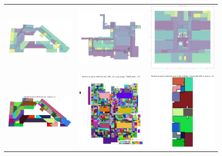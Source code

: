 \documentclass[11pt]{article}
\begin{document}
\begin{figure}[hp]
    \centering
    \begin{tabular}{ccc}
        \includegraphics[width=0.3\linewidth]{figures/SBC_pred-4.png} &
        \includegraphics[width=0.3\linewidth]{figures/SBC_pred-3.png} &
        \includegraphics[width=0.3\linewidth]{figures/SBC_pred-1.png} \\
        \includegraphics[width=0.3\linewidth]{figures/CVSeg_pred-3.png} &
        \includegraphics[width=0.3\linewidth]{figures/CVSeg_pred-2.png} &
        \includegraphics[width=0.3\linewidth]{figures/CVSeg_pred-1.png} \\

\end{tabular}
\end{figure}
\end{document}
